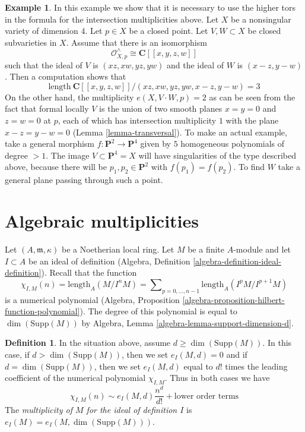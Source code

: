 \documentclass{stacks-project}
\theoremstyle{plain}
\theoremstyle{definition}
\newtheorem{definition}[subsection]{Definition}
\newtheorem{example}[subsection]{Example}
\theoremstyle{remark}
\numberwithin{equation}{subsection}
\begin{document}
\begin{example}
\label{example-naive-multiplicity-wrong}
In this example we show that it is necessary to use the higher
tors in the formula for the intersection multiplicities above.
Let $X$ be a nonsingular variety of dimension $4$.
Let $p \in X$ be a closed point. Let $V, W \subset X$
be closed subvarieties in $X$. Assume that there is an
isomorphism
$$
\mathcal{O}_{X, p}^\wedge \cong \mathbf{C}[[x, y, z, w]]
$$
such that the ideal of $V$ is $(xz, xw, yz, yw)$ and the ideal
of $W$ is $(x - z, y - w)$. Then a computation shows that
$$
\text{length}\ \mathbf{C}[[x, y, z, w]]/
(xz, xw, yz, yw, x - z, y - w) = 3
$$
On the other hand, the multiplicity $e(X, V \cdot W, p) = 2$
as can be seen from the fact that formal locally $V$ is the
union of two smooth planes $x = y = 0$ and $z = w = 0$ at $p$,
each of which has intersection multiplicity $1$ with the plane
$x - z = y - w = 0$ (Lemma \ref{lemma-transversal}). To make an
actual example, take
a general morphism $f : \mathbf{P}^2 \to \mathbf{P}^4$ given by
$5$ homogeneous polynomials of degree $> 1$. The image
$V \subset \mathbf{P}^4 = X$ will have singularities of the type
described above, because there will be $p_1, p_2 \in \mathbf{P}^2$
with $f(p_1) = f(p_2)$. To find $W$ take a general plane passing
through such a point.
\end{example}






\section{Algebraic multiplicities}
\label{section-multiplicities}

\noindent
Let $(A, \mathfrak m, \kappa)$ be a Noetherian local ring.
Let $M$ be a finite $A$-module and let $I \subset A$ be an ideal
of definition (Algebra, Definition \ref{algebra-definition-ideal-definition}).
Recall that the function
$$
\chi_{I, M}(n) = \text{length}_A(M/I^nM) =
\sum\nolimits_{p = 0, \ldots, n - 1} \text{length}_A(I^pM/I^{p + 1}M)
$$
is a numerical polynomial
(Algebra, Proposition \ref{algebra-proposition-hilbert-function-polynomial}).
The degree of this polynomial is equal to $\dim(\text{Supp}(M))$ by
Algebra, Lemma \ref{algebra-lemma-support-dimension-d}.

\begin{definition}
\label{definition-multiplicity}
In the situation above, assume $d \geq \dim(\text{Supp}(M))$.
In this case, if  $d > \dim(\text{Supp}(M))$, then we set $e_I(M, d) = 0$
and if $d = \dim(\text{Supp}(M))$, then we set $e_I(M, d)$ equal to $d!$
times the leading coefficient of the numerical polynomial $\chi_{I, M}$.
Thus in both cases we have
$$
\chi_{I, M}(n) \sim e_I(M, d) \frac{n^d}{d!} + \text{lower order terms}
$$
The {\it multiplicity of $M$ for the ideal of definition $I$}
is $e_I(M) = e_I(M, \dim(\text{Supp}(M)))$.
\end{definition}
\end{document}
